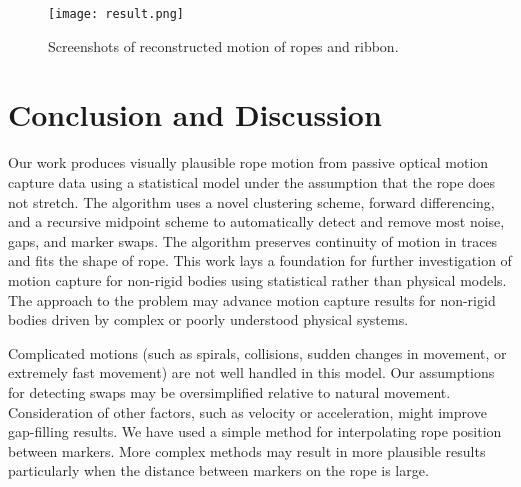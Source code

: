 \begin{figure}[tb]
\texttt{[image: result.png]}
\caption{Screenshots of reconstructed motion of ropes and ribbon.}
\label{fig:Result} 
\end{figure}

\section{Conclusion and Discussion} 

Our work produces visually plausible rope motion from passive optical motion capture data using a statistical model under the assumption that the rope does not stretch.  The algorithm uses a novel clustering scheme, forward differencing, and a recursive midpoint scheme to automatically detect and remove most noise, gaps, and marker swaps.  The algorithm preserves continuity of motion in traces and fits the shape of rope.  This work lays a foundation for further investigation of motion capture for non-rigid bodies using statistical rather than physical models.  The approach to the problem may advance motion capture results for non-rigid bodies driven by complex or poorly understood physical systems.

Complicated motions (such as spirals, collisions, sudden changes in movement, or extremely fast movement) are not well handled in this model. Our assumptions for detecting swaps may be oversimplified relative to natural movement. Consideration of other factors, such as velocity or acceleration, might improve gap-filling results.  We have used a simple method for interpolating rope position between markers.  More complex methods may result in more plausible results particularly when the distance between markers on the rope is large.  
